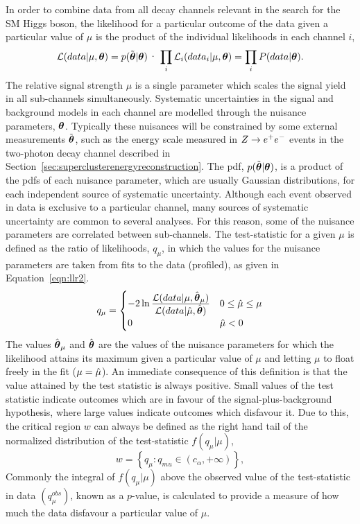 In order to combine data from all decay channels relevant in the search for the
SM Higgs boson, the likelihood for a particular outcome of the data given a particular
value of $\mu$ is the product of the individual likelihoods in each channel $i$,
\begin{equation}
\mathcal{L}(data|\mu,\boldth)= p(\boldthmeas|\boldth)\cdot\prod_{i}\mathcal{L}_{i}(data_{i}|\mu,\boldth)
= \prod_{i}P(data|\boldth).
\label{eqn:likelihood}
\end{equation}
The relative signal strength $\mu$ is a single parameter which scales the signal
yield in all sub-channels simultaneously. 
Systematic uncertainties in the signal and background models in each channel
are modelled through the nuisance parameters, ${\boldsymbol{\theta}}$. Typically these nuisances
will be constrained by some external measurements $\tilde{{\boldsymbol{\theta}}}$, such as the energy scale
measured in $Z\rightarrow e^{+}e^{-}$ events in the two-photon decay channel described in 
Section~\ref{sec:superclusterenergyreconstruction}. 
The pdf, $p(\tilde{{\boldsymbol{\theta}}}|{\boldsymbol{\theta}})$, is a product of the pdfs of each nuisance parameter, 
which are usually Gaussian distributions, for each independent source of systematic
uncertainty.
Although each event observed in data is exclusive to a particular channel, 
many sources of systematic uncertainty are common to several analyses. For this
reason, some of the nuisance parameters are correlated between sub-channels.
The test-statistic for a given $\mu$ is defined as the ratio 
of likelihoods, $q_{\mu}$, in which the values for the nuisance parameters are taken from fits to the data (profiled), 
as given in Equation~\ref{eqn:llr2}. 
\begin{equation}
q_{\mu} = 
	\begin {cases} 
	-2\ln\frac{\displaystyle \mathcal{L}(data | \mu,\hat{{\boldsymbol{\theta}}}_{\mu})}
	{\displaystyle \mathcal{L}(data | \hat{\mu},\hat{{\boldsymbol{\theta}}})} 
		&  0 \le \hat{\mu} \le \mu \\
	 0 	&  \hat{\mu} < 0
	\end{cases}
\label{eqn:llr2}
\end{equation}
The values $\hat{{\boldsymbol{\theta}}}_{\mu}$ and $\hat{{\boldsymbol{\theta}}}$ are the values of 
the nuisance parameters for which the likelihood attains its maximum 
given a particular value of $\mu$ and letting $\mu$ to float freely in the fit ($\mu=\hat{\mu}$).
An immediate consequence of this definition is that the value attained
by the test statistic is always positive. Small values of the test
statistic indicate outcomes which are in favour of the signal-plus-background 
hypothesis, where large values indicate outcomes which disfavour it.
Due to this, the critical region $w$ can always be defined as the right
hand tail of the normalized distribution of the test-statistic $f(q_{\mu}|\mu)$, 
\begin{equation}
w = \left\{ q_{\mu} : q_{mu} \in (c_{\alpha},+\infty) \right\},
\end{equation}
Commonly the integral of $f(q_{\mu}|\mu)$ above the observed value of the 
test-statistic in data $(q_{\mu}^{obs})$, known as a $p$-value, is calculated
to provide a measure of how much the data disfavour a particular value of $\mu$. 

